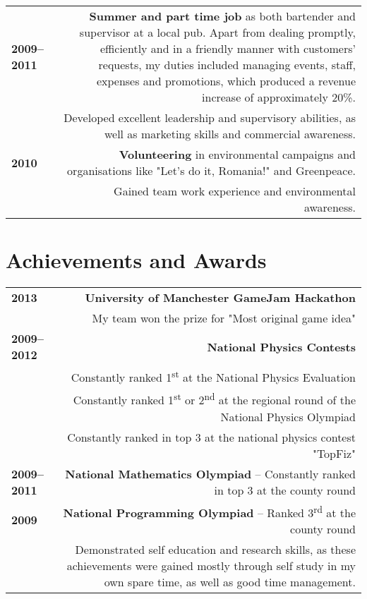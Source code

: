 \documentclass[11pt,a4paper]{article}
\begin{document}
\begin{tabular}{LR}
\bf 2009--2011&\textbf{Summer and part time job} as both bartender and supervisor at a local pub. Apart from dealing promptly, efficiently and in a friendly manner with customers' requests, my duties included managing events, staff, expenses and promotions, which produced a revenue increase of approximately 20\%. \vspace{5pt}\\
&Developed excellent leadership and supervisory abilities, as well as marketing skills and commercial awareness.\vspace{5pt}\\
\bf 2010&\textbf{Volunteering} in environmental campaigns and organisations like "Let's do it, Romania!" and Greenpeace.\vspace{5pt}\\
&Gained team work experience and environmental awareness.\vspace{5pt}\\

\end{tabular}

\section*{Achievements and Awards\vspace{-2ex}}

\begin{tabular}{LR}
\bf 2013& \bf University of Manchester GameJam Hackathon\\
&My team won the prize for "Most original game idea"\vspace{5pt}\\
\bf 2009--2012&\bf National Physics Contests\\
&Constantly ranked 1\textsuperscript{st} at the National Physics Evaluation\\
&Constantly ranked 1\textsuperscript{st} or 2\textsuperscript{nd} at the regional round of the National Physics Olympiad\\
&Constantly ranked in top 3 at the national physics contest "TopFiz"\vspace{5pt}\\

\bf 2009--2011&{\bf National Mathematics Olympiad} -- Constantly ranked in top 3 at the county round\vspace{5pt}\\

\bf 2009&{\bf National Programming Olympiad} -- Ranked 3\textsuperscript{rd} at the county round\vspace{5pt}\\

&Demonstrated self education and research skills, as these achievements were gained mostly through self study in my own spare time, as well as good time management.\vspace{-2ex}\\ 
\end{tabular}
\end{document}
